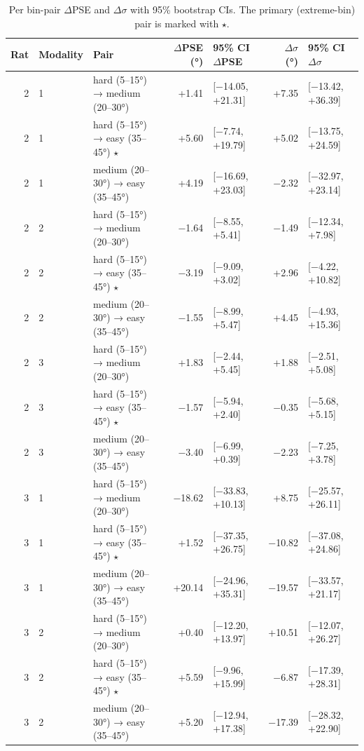 \begin{table}[htbp]
  \centering
  \caption{Per bin-pair $\Delta$PSE and $\Delta\sigma$ with 95\% bootstrap CIs. The primary (extreme-bin) pair is marked with $\star$.}
  \label{tab:perceptual_bias_details}
  \begin{tabular}{rllrlrl}
    \toprule
    Rat & Modality & Pair & $\Delta$PSE (°) & 95\% CI $\Delta$PSE & $\Delta\sigma$ (°) & 95\% CI $\Delta\sigma$ \\
    \midrule
    2 & 1 & hard (5–15°) → medium (20–30°) & +1.41 & [−14.05, +21.31] & +7.35 & [−13.42, +36.39] \\
    2 & 1 & hard (5–15°) → easy (35–45°) $\star$ & +5.60 & [−7.74, +19.79] & +5.02 & [−13.75, +24.59] \\
    2 & 1 & medium (20–30°) → easy (35–45°) & +4.19 & [−16.69, +23.03] & −2.32 & [−32.97, +23.14] \\
    2 & 2 & hard (5–15°) → medium (20–30°) & −1.64 & [−8.55, +5.41] & −1.49 & [−12.34, +7.98] \\
    2 & 2 & hard (5–15°) → easy (35–45°) $\star$ & −3.19 & [−9.09, +3.02] & +2.96 & [−4.22, +10.82] \\
    2 & 2 & medium (20–30°) → easy (35–45°) & −1.55 & [−8.99, +5.47] & +4.45 & [−4.93, +15.36] \\
    2 & 3 & hard (5–15°) → medium (20–30°) & +1.83 & [−2.44, +5.45] & +1.88 & [−2.51, +5.08] \\
    2 & 3 & hard (5–15°) → easy (35–45°) $\star$ & −1.57 & [−5.94, +2.40] & −0.35 & [−5.68, +5.15] \\
    2 & 3 & medium (20–30°) → easy (35–45°) & −3.40 & [−6.99, +0.39] & −2.23 & [−7.25, +3.78] \\
    3 & 1 & hard (5–15°) → medium (20–30°) & −18.62 & [−33.83, +10.13] & +8.75 & [−25.57, +26.11] \\
    3 & 1 & hard (5–15°) → easy (35–45°) $\star$ & +1.52 & [−37.35, +26.75] & −10.82 & [−37.08, +24.86] \\
    3 & 1 & medium (20–30°) → easy (35–45°) & +20.14 & [−24.96, +35.31] & −19.57 & [−33.57, +21.17] \\
    3 & 2 & hard (5–15°) → medium (20–30°) & +0.40 & [−12.20, +13.97] & +10.51 & [−12.07, +26.27] \\
    3 & 2 & hard (5–15°) → easy (35–45°) $\star$ & +5.59 & [−9.96, +15.99] & −6.87 & [−17.39, +28.31] \\
    3 & 2 & medium (20–30°) → easy (35–45°) & +5.20 & [−12.94, +17.38] & −17.39 & [−28.32, +22.90] \\

\end{tabular}
\end{table}
